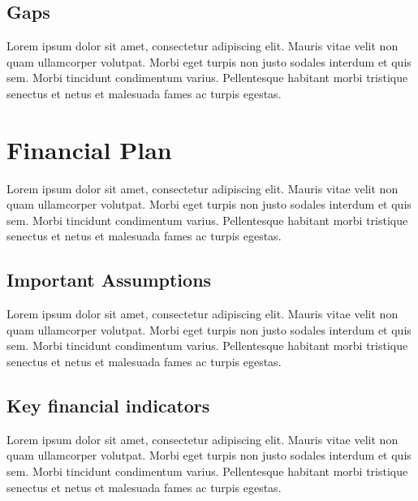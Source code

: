 \documentclass[11pt,titlepage]{article}
\begin{document}
\subsection{Gaps}
Lorem ipsum dolor sit amet, consectetur adipiscing elit. Mauris vitae velit 
non quam ullamcorper volutpat. Morbi eget turpis non justo sodales interdum 
et quis sem. Morbi tincidunt condimentum varius. Pellentesque habitant morbi 
tristique senectus et netus et malesuada fames ac turpis egestas.\newline
\pagebreak

\section{Financial Plan}
Lorem ipsum dolor sit amet, consectetur adipiscing elit. Mauris vitae velit 
non quam ullamcorper volutpat. Morbi eget turpis non justo sodales interdum 
et quis sem. Morbi tincidunt condimentum varius. Pellentesque habitant morbi 
tristique senectus et netus et malesuada fames ac turpis egestas.\newline

\subsection{Important Assumptions}
Lorem ipsum dolor sit amet, consectetur adipiscing elit. Mauris vitae velit 
non quam ullamcorper volutpat. Morbi eget turpis non justo sodales interdum 
et quis sem. Morbi tincidunt condimentum varius. Pellentesque habitant morbi 
tristique senectus et netus et malesuada fames ac turpis egestas.\newline

\subsection{Key financial indicators}
Lorem ipsum dolor sit amet, consectetur adipiscing elit. Mauris vitae velit 
non quam ullamcorper volutpat. Morbi eget turpis non justo sodales interdum 
et quis sem. Morbi tincidunt condimentum varius. Pellentesque habitant morbi 
tristique senectus et netus et malesuada fames ac turpis egestas.\newline
\end{document}
